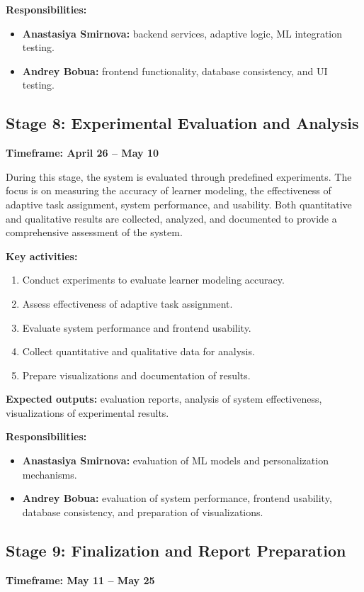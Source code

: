 \documentclass[a4paper,12pt]{extarticle}
\begin{document}
\textbf{Responsibilities:}
\begin{itemize}
    \item \textbf{Anastasiya Smirnova:} backend services, adaptive logic, ML integration testing.
    \item \textbf{Andrey Bobua:} frontend functionality, database consistency, and UI testing.
\end{itemize}

\subsection{Stage 8: Experimental Evaluation and Analysis}
\textbf{Timeframe: April 26 -- May 10}

During this stage, the system is evaluated through predefined experiments. The focus is on measuring the accuracy of learner modeling, the effectiveness of adaptive task assignment, system performance, and usability. Both quantitative and qualitative results are collected, analyzed, and documented to provide a comprehensive assessment of the system.

\textbf{Key activities:}
\begin{enumerate}
    \item Conduct experiments to evaluate learner modeling accuracy.
    \item Assess effectiveness of adaptive task assignment.
    \item Evaluate system performance and frontend usability.
    \item Collect quantitative and qualitative data for analysis.
    \item Prepare visualizations and documentation of results.
\end{enumerate}

\textbf{Expected outputs:} evaluation reports, analysis of system effectiveness, visualizations of experimental results.

\textbf{Responsibilities:}
\begin{itemize}
    \item \textbf{Anastasiya Smirnova:} evaluation of ML models and personalization mechanisms.
    \item \textbf{Andrey Bobua:} evaluation of system performance, frontend usability, database consistency, and preparation of visualizations.
\end{itemize}

\subsection{Stage 9: Finalization and Report Preparation}
\textbf{Timeframe: May 11 -- May 25}
\end{document}
